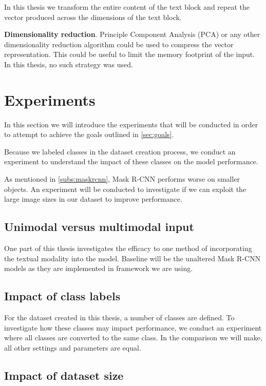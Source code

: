 \documentclass[oneside, english, bibtex]{kththesis}
\begin{document}
In this thesis we transform the entire content of the text block and repeat the vector produced across the dimensions of the text block. 

\textbf{Dimensionality reduction}. Principle Component Analysis (PCA) or any other dimensionality reduction algorithm could be used to compress the vector representation. This could be useful to limit the memory footprint of the input. In this thesis, no such strategy was used.

\clearpage

\section{Experiments}
\label{sec:experiments}

In this section we will introduce the experiments that will be conducted in order to attempt to achieve the goals outlined in \autoref{sec:goals}.

Because we labeled classes in the dataset creation process, we conduct an experiment to understand the impact of these classes on the model performance.

As mentioned in \autoref{subs:maskrcnn}, Mask R-CNN performs worse on smaller objects. An experiment will be conducted to investigate if we can exploit the large image sizes in our dataset to improve performance.


\subsection{Unimodal versus multimodal input}

One part of this thesis investigates the efficacy to one method of incorporating the textual modality into the model.
Baseline will be the unaltered Mask R-CNN models as they are implemented in framework we are using.

\subsection{Impact of class labels}

For the dataset created in this thesis, a number of classes are defined.
To investigate how these classes may impact performance, we conduct an experiment where all classes are converted to the same class.
In the comparison we will make, all other settings and parameters are equal.

\subsection{Impact of dataset size}
\end{document}
